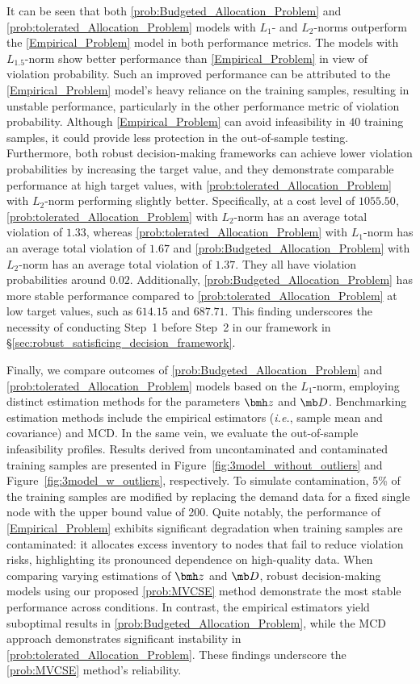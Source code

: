 \documentclass[mnsc, nonblindrev]{informswp}
\newcommand{\1}[1]{\mathds{1}{\left(#1\right)}}
\begin{document}
It can be seen that both \ref{prob:Budgeted_Allocation_Problem} and \ref{prob:tolerated_Allocation_Problem} models with $L_1$- and $L_2$-norms outperform the \ref{Empirical_Problem} model in both performance metrics. The models with $L_{1.5}$-norm show better performance than \ref{Empirical_Problem} in view of violation probability. Such an improved performance can be attributed to the \ref{Empirical_Problem} model's heavy reliance on the training samples, resulting in unstable performance, particularly in the other performance metric of violation probability. Although \ref{Empirical_Problem} can avoid infeasibility in $40$ training samples, it could provide less protection in the out-of-sample testing. Furthermore, both robust decision-making frameworks can achieve lower violation probabilities by increasing the target value, and they demonstrate comparable performance at high target values, with \ref{prob:tolerated_Allocation_Problem} with $L_2$-norm performing slightly better. Specifically, at a cost level of $1055.50$,
\ref{prob:tolerated_Allocation_Problem} with $L_2$-norm has an average total violation of $1.33$, whereas \ref{prob:tolerated_Allocation_Problem} with $L_1$-norm has an average total violation of $1.67$ and \ref{prob:Budgeted_Allocation_Problem} with $L_2$-norm has an average total violation of $1.37$. They all have violation probabilities around $0.02$.
Additionally, \ref{prob:Budgeted_Allocation_Problem} has more stable performance compared to \ref{prob:tolerated_Allocation_Problem} at low target values, such as $614.15$ and $687.71$. This finding underscores the necessity of conducting Step~1 before Step~2 in our framework in \S \ref{sec:robust_satisficing_decision_framework}.

Finally, we compare outcomes of \ref{prob:Budgeted_Allocation_Problem} and \ref{prob:tolerated_Allocation_Problem} models based on the  $L_1$-norm, employing distinct estimation methods for the parameters $\bmh z$ and $\mb D$. Benchmarking estimation methods include the empirical estimators (\textit{i.e.}, sample mean and covariance) and MCD.
In the same vein, we evaluate the out-of-sample infeasibility profiles. Results derived from uncontaminated and contaminated training samples are presented in Figure~\ref{fig:3model_without_outliers} and Figure~\ref{fig:3model_w_outliers}, respectively. To simulate contamination, 5\% of the training samples are modified by replacing the demand data for a fixed single node with the upper bound value of 200. Quite notably, the performance of \ref{Empirical_Problem} exhibits significant degradation when training samples are contaminated: it allocates excess inventory to nodes that fail to reduce violation risks, highlighting its pronounced dependence on high-quality data. When comparing varying estimations of $\bmh z$ and $\mb D$, robust decision-making models using our proposed \ref{prob:MVCSE} method demonstrate the most stable performance across conditions. In contrast, the empirical estimators yield suboptimal results in \ref{prob:Budgeted_Allocation_Problem}, while the MCD approach demonstrates significant instability in \ref{prob:tolerated_Allocation_Problem}. These findings underscore the \ref{prob:MVCSE} method's reliability.
\end{document}
